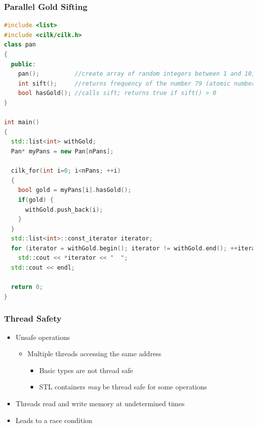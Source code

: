 \documentclass[fleqn,xcolor=table,10pt,final]{beamer}
\begin{document}
\begin{frame}[fragile]
  \frametitle{Parallel Gold Sifting}
  \begin{lstlisting}[language=C++,basicstyle=\scriptsize]
#include <list>
#include <cilk/cilk.h>
class pan
{
  public:
    pan();          //create array of random integers between 1 and 10,000
    int sift();     //returns frequency of the number 79 (atomic number of gold)
    bool hasGold(); //calls sift; returns true if sift() > 0
}

int main()
{
  std::list<int> withGold;
  Pan* myPans = new Pan[nPans];

  cilk_for(int i=0; i<nPans; ++i)
  {
    bool gold = myPans[i].hasGold();
    if(gold) {
      withGold.push_back(i);
    }
  }
  std::list<int>::const_iterator iterator;
  for (iterator = withGold.begin(); iterator != withGold.end(); ++iterator)
    std::cout << *iterator << "  ";
  std::cout << endl;

  return 0;
}
  \end{lstlisting}
\end{frame}


\begin{frame}
  \frametitle{Thread Safety}
  \begin{itemize}
    \item Unsafe operations
      \begin{itemize}
        \item Multiple threads accessing the same address
          \begin{itemize}
            \item Basic types are not thread safe
            \item STL containers \emph{may} be thread safe for some operations
          \end{itemize}
      \end{itemize}
    \itemsep 0.5cm
    \item<2-> Threads read and write memory at undetermined times
    \item<3-> Leads to a race condition
  \end{itemize}
\end{frame}
\end{document}
